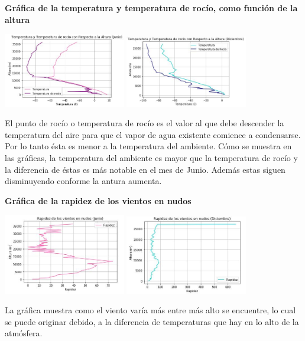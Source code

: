 \documentclass{article}
\begin{document}
\textbf{Gráfica de la temperatura y temperatura de rocío, como función de la altura}
\begin{center}
    \includegraphics[width=0.4\textwidth]{RocioJ.JPG}
    \includegraphics[width=0.4\textwidth]{RocioD.JPG}
\end{center}
El punto de rocío o temperatura de rocío es el valor al que debe descender la temperatura del aire para que el vapor de agua existente comience a condensarse. Por lo tanto ésta es menor a la temperatura del ambiente.
Cómo se muestra en las gráficas, la temperatura del ambiente es mayor que la temperatura de rocío y la diferencia de éstas es más notable en el mes de Junio. Además estas siguen disminuyendo conforme la antura aumenta.

\textbf{Gráfica de la rapidez de los vientos en nudos}
\begin{center}
    \includegraphics[width=0.4\textwidth]{RapidezJ.JPG}
    \includegraphics[width=0.4\textwidth]{RapidezD.JPG}
\end{center}
La gráfica muestra como el viento varía más entre más alto se encuentre, lo cual se puede originar debido, a la diferencia de temperaturas que hay en lo alto de la atmósfera.
\end{document}
